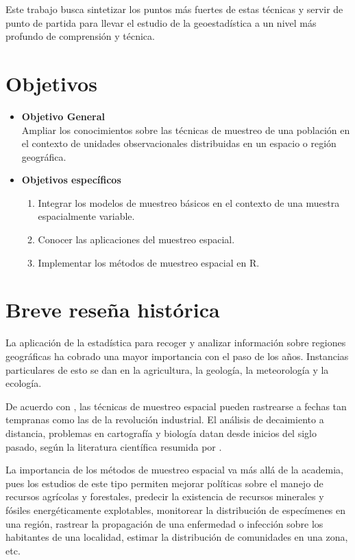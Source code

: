\documentclass[14pt]{extarticle}
\begin{document}
Este trabajo busca sintetizar los puntos más fuertes de estas técnicas y servir de punto de partida para llevar el estudio de la geoestadística a un nivel más profundo de comprensión y técnica. 


\newpage
\section*{Objetivos}
\begin{itemize}
	\item \textbf{Objetivo General}\\
	Ampliar los conocimientos sobre las técnicas de muestreo de una población en el contexto de unidades observacionales distribuidas en un espacio o región geográfica. 
	\item \textbf{Objetivos específicos}	
	\begin{enumerate}
		\item Integrar los modelos de muestreo básicos en el contexto de una muestra espacialmente variable. 
		\item Conocer las aplicaciones del muestreo espacial. 
		\item Implementar los métodos de muestreo espacial en R. 
	\end{enumerate}
\end{itemize}

\newpage
\section{Breve reseña histórica}
La aplicación de la estadística para recoger y analizar información sobre regiones geográficas ha cobrado una mayor importancia con el paso de los años. Instancias particulares de esto se dan en la agricultura\cite{Benedetti.2015}, la geología\cite{Thompson.2012}, la meteorología\cite{Cressie.1986} y la ecología\cite{Brus.2022}. 

De acuerdo con \cite{Alinghaus.1996}, las técnicas de muestreo espacial pueden rastrearse a fechas tan tempranas como las de la revolución industrial. El análisis de decaimiento a distancia, problemas en cartografía y biología datan desde inicios del siglo pasado, según la literatura científica resumida por \cite{Alinghaus.1996}. 

La importancia de los métodos de muestreo espacial va más allá de la academia, pues los estudios de este tipo permiten mejorar políticas sobre el manejo de recursos agrícolas y forestales\cite{Benedetti.2015}, predecir la existencia de recursos minerales y fósiles energéticamente explotables\cite{Thompson.2012, Cressie.1986, Journel.1987}, monitorear la distribución de especímenes en una región\cite{Brus.2022}, rastrear la propagación de una enfermedad o infección sobre los habitantes de una localidad, estimar la distribución de comunidades en una zona\cite{Benedetti.2015}, etc. 
\end{document}
